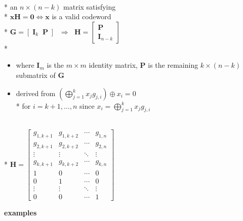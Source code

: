 \documentclass[10pt, landscape]{article}
\begin{document}
\begin{multicols*}{4}
  \begin{tightcenter}
     \\* an $n \times (n-k)$ matrix satisfying \\*
    $\mathbf{xH} = \mathbf{0} \iff \mathbf{x}$ is a valid codeword \\*
    $\mathbf{G} = [\; \mathbf{I}_k \;\; \mathbf{P}\;]$ $\;\Longrightarrow\;$ $\mathbf{H} = \begin{bmatrix}
      \mathbf{P} \\ \mathbf{I}_{n-k}
    \end{bmatrix}$ \\*
  \end{tightcenter}

  \begin{itemize}
    \item where $\mathbf{I}_{m}$ is the $m \times m$ identity matrix, $\mathbf{P}$ is the remaining $k \times (n-k)$ submatrix of $\mathbf{G}$
    \item derived from $\left( \bigoplus^k_{j=1} x_j g_{j,i} \right) \oplus x_i = 0$ 
      \\* for $i = k+1, \dots, n$ since $x_i =  \bigoplus^k_{j=1} x_j g_{j,i}$
  \end{itemize}

  \begin{tightcenter}
     \\*
    \( {\displaystyle{ 
        \mathbf{H} = \begin{bmatrix}
          g_{1,k+1} & g_{1,k+2} & \cdots & g_{1,n} \\
          g_{2,k+1} & g_{2,k+2} & \cdots & g_{2,n} \\
          \vdots & \vdots & \ddots & \vdots \\
          g_{k,k+1} & g_{k,k+2} & \cdots & g_{k,n} \\
          1 & 0 & \cdots & 0 \\
          0 & 1 & \cdots & 0 \\
          \vdots & \vdots & \ddots & \vdots \\
          0 & 0 & \cdots & 1
        \end{bmatrix}  
    }} \) 
  \end{tightcenter}

  \textbf{examples}


\end{multicols*}
\end{document}
